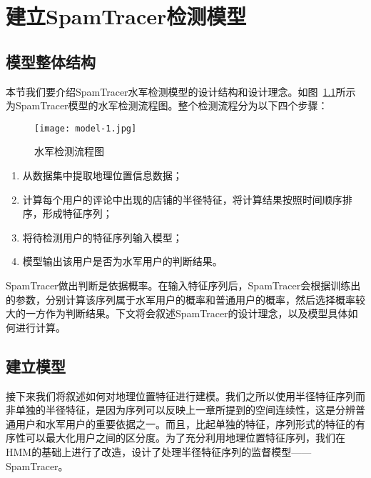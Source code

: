 
\chapter{建立SpamTracer检测模型}
\label{chap:model}


\section{模型整体结构}

本节我们要介绍SpamTracer水军检测模型的设计结构和设计理念。如图~\ref{fig:structure}所示为SpamTracer模型的水军检测流程图。整个检测流程分为以下四个步骤：

\begin{figure}[htbp]
	\centering
	\begin{minipage}[htbp]{\textwidth}
		\centering
		\texttt{[image: model-1.jpg]}
		\caption[水军检测流程图]
		{水军检测流程图\label{fig:structure}}		
	\end{minipage}     
\end{figure}

\begin{enumerate}
	\item[(1)] 从数据集中提取地理位置信息数据；
	\item[(2)] 计算每个用户的评论中出现的店铺的半径特征，将计算结果按照时间顺序排序，形成特征序列；
	\item[(3)] 将待检测用户的特征序列输入模型；
	\item[(4)] 模型输出该用户是否为水军用户的判断结果。
\end{enumerate}

SpamTracer做出判断是依据概率。在输入特征序列后，SpamTracer会根据训练出的参数，分别计算该序列属于水军用户的概率和普通用户的概率，然后选择概率较大的一方作为判断结果。下文将会叙述SpamTracer的设计理念，以及模型具体如何进行计算。



\section{建立模型}

接下来我们将叙述如何对地理位置特征进行建模。我们之所以使用半径特征序列而非单独的半径特征，是因为序列可以反映上一章所提到的空间连续性，这是分辨普通用户和水军用户的重要依据之一。而且，比起单独的特征，序列形式的特征的有序性可以最大化用户之间的区分度。为了充分利用地理位置特征序列，我们在HMM的基础上进行了改造，设计了处理半径特征序列的监督模型——SpamTracer。

